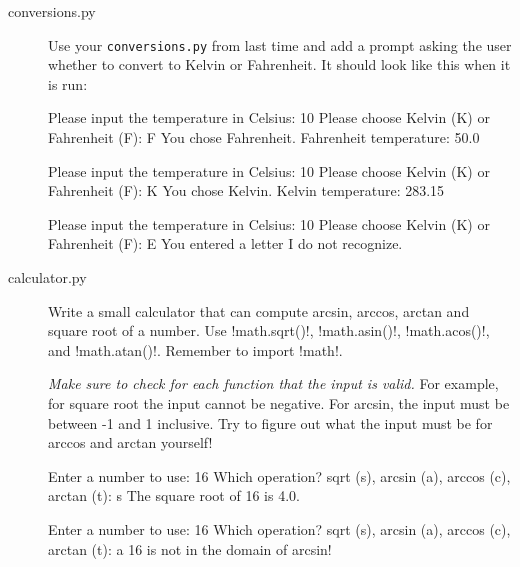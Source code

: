 \documentclass[11pt]{cselabheader}
\begin{document}
\begin{description}
  \item[conversions.py] Use your \texttt{conversions.py} from last time and add a
    prompt asking the user whether to convert to Kelvin or Fahrenheit. It should
    look like this when it is run:

    \begin{verbatimcode}
Please input the temperature in Celsius: 10
Please choose Kelvin (K) or Fahrenheit (F): F
You chose Fahrenheit.
Fahrenheit temperature: 50.0
    \end{verbatimcode}

    \begin{verbatimcode}
Please input the temperature in Celsius: 10
Please choose Kelvin (K) or Fahrenheit (F): K
You chose Kelvin.
Kelvin temperature: 283.15
    \end{verbatimcode}

    \begin{verbatimcode}
Please input the temperature in Celsius: 10
Please choose Kelvin (K) or Fahrenheit (F): E
You entered a letter I do not recognize.
    \end{verbatimcode}

  \item[calculator.py] Write a small calculator that can compute arcsin, arccos,
    arctan and square root of a number. Use \pythoninline!math.sqrt()!,
    \pythoninline!math.asin()!, \pythoninline!math.acos()!, and
    \pythoninline!math.atan()!. Remember to import \pythoninline!math!.

    \emph{Make sure to check for each function that the input is valid.} For
    example, for square root the input cannot be negative. For arcsin, the input
    must be between -1 and 1 inclusive. Try to figure out what the input must be
    for arccos and arctan yourself!

    \begin{verbatimcode}
Enter a number to use: 16
Which operation? sqrt (s), arcsin (a), arccos (c), arctan (t): s
The square root of 16 is 4.0.
    \end{verbatimcode}

    \begin{verbatimcode}
Enter a number to use: 16
Which operation? sqrt (s), arcsin (a), arccos (c), arctan (t): a
16 is not in the domain of arcsin!
    \end{verbatimcode}


\end{description}
\end{document}

